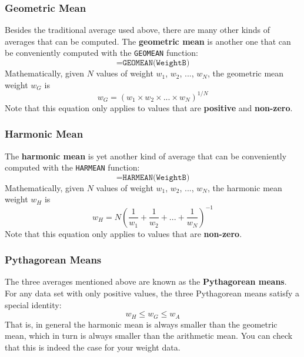\subsubsection{Geometric Mean}
%
Besides the traditional average used above, there are many other kinds of averages that can be computed. The \textbf{geometric mean} is another one that can be conveniently computed with the \texttt{GEOMEAN} function:
\begin{equation}
    \texttt{=GEOMEAN(WeightB)}
\end{equation}
Mathematically, given $N$ values of weight $w_{1}$, $w_{2}$, ..., $w_{N}$, the geometric mean weight $w_{G}$ is
\begin{equation}
    w_{G} = \left( w_{1} \times w_{2} \times ... \times w_{N} \right)^{1/N}
\end{equation}
Note that this equation only applies to values that are \textbf{positive} and \textbf{non-zero}.
%
\subsubsection{Harmonic Mean}
%
The \textbf{harmonic mean} is yet another kind of average that can be conveniently computed with the \texttt{HARMEAN} function:
\begin{equation}
    \texttt{=HARMEAN(WeightB)}
\end{equation}
Mathematically, given $N$ values of weight $w_{1}$, $w_{2}$, ..., $w_{N}$, the harmonic mean weight $w_{H}$ is
\begin{equation}
    w_{H} = N \left( \frac{1}{w_{1}} + \frac{1}{w_{2}} + ... + \frac{1}{w_{N}} \right)^{-1}
\end{equation}
Note that this equation only applies to values that are \textbf{non-zero}.
%
\subsubsection{Pythagorean Means}
%
The three averages mentioned above are known as the \textbf{Pythagorean means}. For any data set with only positive values, the three Pythagorean means satisfy a special identity:
\begin{equation}
    w_{H} \leq w_{G} \leq w_{A}
\end{equation}
That is, in general the harmonic mean is always smaller than the geometric mean, which in turn is always smaller than the arithmetic mean. You can check that this is indeed the case for your weight data.
%
